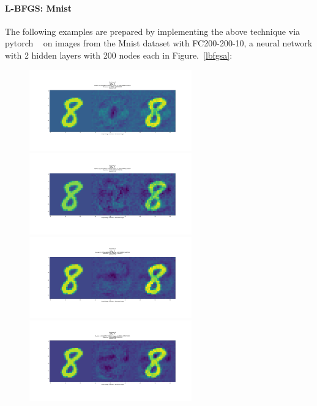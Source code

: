 
\paragraph{L-BFGS: Mnist}
The following examples are prepared by implementing the above
technique via pytorch ~\citep{pytorch2019} on images from the Mnist
dataset with FC200-200-10, a neural network with 2 hidden layers with
200 nodes each in Figure.~\ref{lbfgsa}:
\begin{figure}[ht]

\includegraphics[trim=200 185 100 200, clip, width=7cm]{c1_figures/FC200-200-10-2448-O8-A0-attack_summary.png}\includegraphics[trim=200 185 100 200, clip,width=7cm]{c1_figures/FC200-200-10-2448-O8-A1-attack_summary.png}
\includegraphics[trim=200 185 100 200, clip,width=7cm]{c1_figures/FC200-200-10-2448-O8-A2-attack_summary.png}\includegraphics[trim=200 185 100 200, clip,width=7cm]{c1_figures/FC200-200-10-2448-O8-A3-attack_summary.png}

\end{figure}
